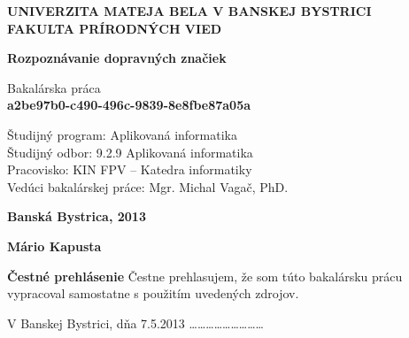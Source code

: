 \documentclass[12pt]{article}
\begin{document}
\begin{titlepage}

\begin{center}

\begin{spacing}{1.5} 
{\Large \bfseries UNIVERZITA MATEJA BELA V BANSKEJ BYSTRICI\\
FAKULTA PRÍRODNÝCH VIED}\\[5cm]
\end{spacing}

\begin{spacing}{1.5} 
{\Large \bfseries Rozpoznávanie dopravných značiek}\\
\end{spacing}

{\large Bakalárska práca}\\
\bfseries a2be97b0-c490-496c-9839-8e8fbe87a05a\\[5cm]
\end{center}

\begin{flushleft}
Študijný program: Aplikovaná informatika\\
Študijný odbor: 9.2.9 Aplikovaná informatika\\
Pracovisko: KIN FPV – Katedra informatiky\\
Vedúci bakalárskej práce: Mgr. Michal Vagač, PhD.\\

\end{flushleft}

\vfill

\begin{minipage}{0.5\textwidth}
\begin{flushleft}
\textbf{Banská Bystrica, 2013}
\end{flushleft}
\end{minipage}
\begin{minipage}{0.5\textwidth}
\begin{flushright}
\textbf{Mário Kapusta}
\end{flushright}
\end{minipage}
\end{titlepage}
\thispagestyle{empty}
\restoregeometry
\null
\vfill
\textbf{Čestné prehlásenie}
Čestne prehlasujem, že som túto bakalársku prácu vypracoval samostatne s použitím
uvedených zdrojov.
\begin{multicols}{2}
V Banskej Bystrici, dňa 7.5.2013
\columnbreak
\flushright \ldots \ldots \ldots \ldots \ldots \ldots \ldots \ldots \ldots
\end{multicols}
\thispagestyle{empty}
\clearpage
\null
\vfill
\end{document}
